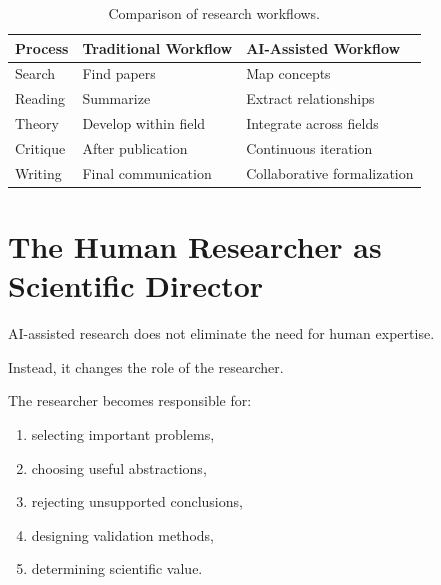 \documentclass[11pt]{article}
\begin{document}
\begin{table}[h]

\centering

\begin{tabular}{lll}

\toprule

Process & Traditional Workflow & AI-Assisted Workflow \\

\midrule

Search
& Find papers
& Map concepts
\\

Reading
& Summarize
& Extract relationships
\\

Theory
& Develop within field
& Integrate across fields
\\

Critique
& After publication
& Continuous iteration
\\

Writing
& Final communication
& Collaborative formalization
\\

\bottomrule

\end{tabular}

\caption{
Comparison of research workflows.
}

\end{table}



\section{The Human Researcher as Scientific Director}


AI-assisted research does not eliminate the need for human expertise.


Instead, it changes the role of the researcher.


The researcher becomes responsible for:


\begin{enumerate}

\item selecting important problems,

\item choosing useful abstractions,

\item rejecting unsupported conclusions,

\item designing validation methods,

\item determining scientific value.

\end{enumerate}
\end{document}
